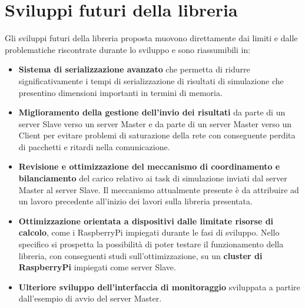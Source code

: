 \section{Sviluppi futuri della libreria}
Gli sviluppi futuri della libreria proposta muovono direttamente dai limiti e dalle problematiche riscontrate durante lo sviluppo e sono riassumibili in:

\begin{itemize}
    \item \textbf{Sistema di serializzazione avanzato} che permetta di ridurre significativamente i tempi di serializzazione di risultati di simulazione che presentino dimensioni importanti in termini di memoria.
    \item \textbf{Miglioramento della gestione dell'invio dei risultati} da parte di un server Slave verso un server Master e da parte di un server Master verso un Client per evitare problemi di saturazione della rete con conseguente perdita di pacchetti e ritardi nella comunicazione.
    \item \textbf{Revisione e ottimizzazione del meccanismo di coordinamento e bilanciamento} del carico relativo ai task di simulazione inviati dal server Master al server Slave. Il meccanismo attualmente presente è da attribuire ad un lavoro precedente all'inizio dei lavori sulla libreria presentata.
    \item \textbf{Ottimizzazione orientata a dispositivi dalle limitate risorse di calcolo}, come i RaspberryPi impiegati durante le fasi di sviluppo. Nello specifico si prospetta la possibilità di poter testare il funzionamento della libreria, con conseguenti studi sull'ottimizzazione, su un \textbf{cluster di RaspberryPi} impiegati come server Slave.
    \item \textbf{Ulteriore sviluppo dell'interfaccia di monitoraggio} sviluppata a partire dall'esempio di avvio del server Master.
\end{itemize}